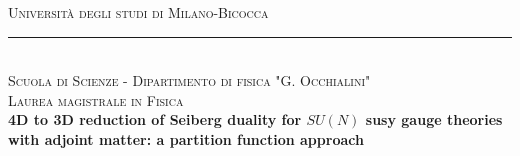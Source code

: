 
\begin{titlepage}

\center %
 
\textsc{\Large Università degli studi di %
 Milano-Bicocca}
\\
\rule{\linewidth}{0.8pt} 
\\[0.3cm]


\vspace{0.3cm} %
\textsc{\large Scuola di Scienze - Dipartimento di fisica "G. Occhialini"}\\%
\vspace{1cm}
\textsc{\LARGE Laurea magistrale in Fisica}\\ %


\vspace{1.3cm}
{ \LARGE \bfseries \boldmath 4D to 3D reduction of Seiberg duality for $SU(N)$ susy gauge theories with adjoint matter: a partition function approach}\\ %


\end{titlepage}
